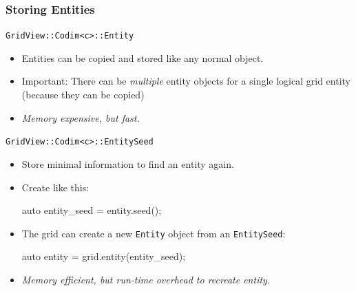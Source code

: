 \documentclass[aspectratio=169,11pt]{beamer}
\theoremstyle{definition}
\begin{document}
\begin{frame}[fragile]
  \frametitle{Storing Entities}

  \vfill

  \pause
  \lstinline!GridView::Codim<c>::Entity!
  \begin{itemize}
  \item Entities can be copied and stored like any normal object.
  \item Important: There can be \emph{multiple} entity objects for a single logical grid entity (because they can be copied)
  \item \emph{Memory expensive, but fast.}
  \end{itemize}

  \vfill

  \pause

  \lstinline!GridView::Codim<c>::EntitySeed!


  \begin{itemize}
  \item Store minimal information to find an entity again.
  \item Create like this:
    \begin{cppcode}
auto entity_seed = entity.seed();
    \end{cppcode}
  \item The grid can create a new \lstinline!Entity! object from an \lstinline!EntitySeed!:
    \begin{cppcode}
auto entity = grid.entity(entity_seed);
    \end{cppcode}
  \item \emph{Memory efficient, but run-time overhead to recreate entity.}
  \end{itemize}

\end{frame}

\end{document}
